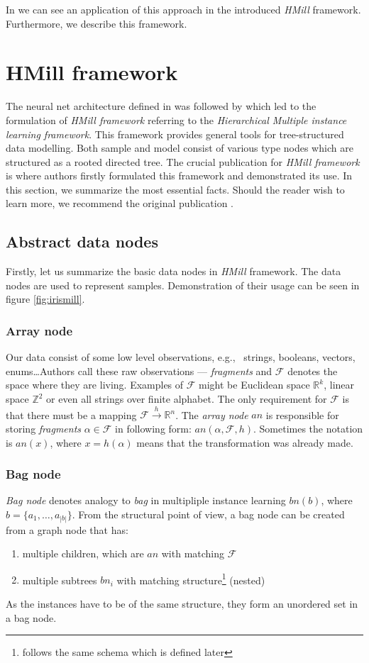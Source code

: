 In \cite{Mandlik2020} we can see an application of this approach in the introduced \emph{HMill} framework. Furthermore, we describe this framework.

\section{HMill framework}
The neural net architecture defined in \cite{Pevny2016a} was followed by \cite{Mandlik2020} which led to the formulation of \emph{HMill framework} referring to the \emph{Hierarchical Multiple instance learning framework}. This framework provides general tools for tree-structured data modelling. Both sample and model consist of various type nodes which are structured as a rooted directed tree. The crucial publication for \emph{HMill framework} is \cite{Mandlik2020} where authors firstly formulated this framework and demonstrated its use. In this section, we summarize the most essential facts. Should the reader wish to learn more, we recommend the original publication \cite{Mandlik2020}.

\subsection{Abstract data nodes}
Firstly, let us summarize the basic data nodes in \emph{HMill} framework. The data nodes are used to represent samples. Demonstration of their usage can be seen in figure \ref{fig:irismill}.
\subsubsection{Array node}
Our data consist of some low level observations, e.g., \ strings, booleans, vectors, enums\dots Authors call these raw observations --- \emph{fragments} and $\mathcal{F}$ denotes the space where they are living. Examples of $\mathcal{F}$ might be Euclidean space $\mathbb{R}^{k}$, linear space $\mathbb{Z}^{2}$ or even all strings over finite alphabet. The only requirement for $\mathcal{F}$ is that there must be a mapping $\mathcal{F}\xrightarrow{h}\mathbb{R}^{n}$. The \emph{array node} $an$ is responsible for storing \emph{fragments} $\alpha\in\mathcal{F}$ in following form: $an(\alpha,\mathcal{F},h)$. Sometimes the notation is $an(x)$, where $x=h(\alpha)$ means that the transformation was already made.

\subsubsection{Bag node}
\emph{Bag node} denotes analogy to \emph{bag} in multipliple instance learning $bn(b)$, where $b=\{a_1,\dots,a_{|b|}\}$. 
From the structural point of view, a bag node can be created from a graph node that has:
\begin{enumerate}
    \itemsep0em 
	\item multiple children, which are $an$ with matching $\mathcal{F}$
	\item multiple subtrees $bn_i$ with matching structure\footnote{follows the same schema which is defined later} (nested)
\end{enumerate}
As the instances have to be of the same structure, they form an unordered set in a bag node.

